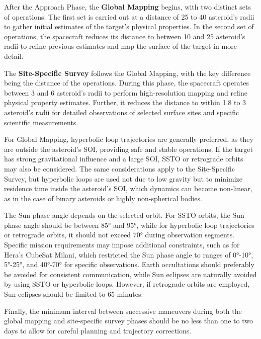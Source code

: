 \documentclass{Configuration_gigi/PoliMi3i_thesis}
\begin{document}
After the Approach Phase, the \textbf{Global Mapping} begins, with two distinct sets of operations. The first set is carried out at a distance of 25 to 40 asteroid's radii to gather initial estimates of the target’s physical properties. In the second set of operations, the spacecraft reduces its distance to between 10 and 25 asteroid's radii to refine previous estimates and map the surface of the target in more detail.

The \textbf{Site-Specific Survey} follows the Global Mapping, with the key difference being the distance of the operations. During this phase, the spacecraft operates between 3 and 6 asteroid's radii to perform high-resolution mapping and refine physical property estimates. Further, it reduces the distance to within 1.8 to 3 asteroid's radii for detailed observations of selected surface sites and specific scientific measurements. 

For Global Mapping, hyperbolic loop trajectories are generally preferred, as they are outside the asteroid's SOI, providing safe and stable operations. If the target has strong gravitational influence and a large SOI, SSTO or retrograde orbits may also be considered. The same considerations apply to the Site-Specific Survey, but hyperbolic loops are used not due to low gravity but to minimize residence time inside the asteroid's SOI, which dynamics can become non-linear, as in the case of binary asteroids or highly non-spherical bodies.

The Sun phase angle depends on the selected orbit. For SSTO orbits, the Sun phase angle should be between 85° and 95°, while for hyperbolic loop trajectories or retrograde orbits, it should not exceed 70° during observation segments. Specific mission requirements may impose additional constraints, such as for Hera’s CubeSat Milani, which restricted the Sun phase angle to ranges of 0°-10°, 5°-25°, and 40°-70° for specific observations. Earth occultations should preferably be avoided for consistent communication, while Sun eclipses are naturally avoided by using SSTO or hyperbolic loops. However, if retrograde orbits are employed, Sun eclipses should be limited to 65 minutes.

Finally, the minimum interval between successive maneuvers during both the global mapping and site-specific survey phases should be no less than one to two days to allow for careful planning and trajectory corrections.
\end{document}
